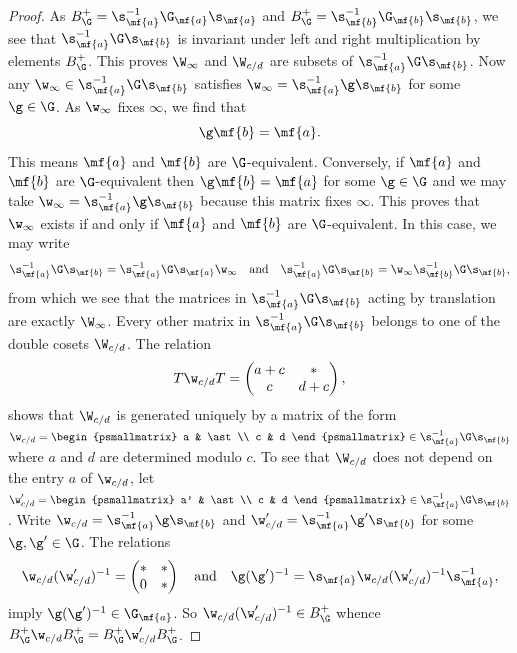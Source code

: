 \documentclass[12pt]{article}
\begin{document}
      \begin{proof}
        As \(B_{\G}^{+} = \s_{\mf{a}}^{-1}\G_{\mf{a}}\s_{\mf{a}}\) and \(B_{\G}^{+} = \s_{\mf{b}}^{-1}\G_{\mf{b}}\s_{\mf{b}}\), we see that \(\s_{\mf{a}}^{-1}\G\s_{\mf{b}}\) is invariant under left and right multiplication by elements \(B_{\G}^{+}\). This proves \(\W_{\infty}\) and \(\W_{c/d}\) are subsets of \(\s_{\mf{a}}^{-1}\G\s_{\mf{b}}\). Now any \(\w_{\infty} \in \s_{\mf{a}}^{-1}\G\s_{\mf{b}}\) satisfies \(\w_{\infty} = \s_{\mf{a}}^{-1}\g\s_{\mf{b}}\) for some \(\g \in \G\). As \(\w_{\infty}\) fixes \(\infty\), we find that
        \[
          \g\mf{b} = \mf{a}.
        \]
        This means \(\mf{a}\) and \(\mf{b}\) are \(\G\)-equivalent. Conversely, if \(\mf{a}\) and \(\mf{b}\) are \(\G\)-equivalent then \(\g\mf{b} = \mf{a}\) for some \(\g \in \G\) and we may take \(\w_{\infty} = \s_{\mf{a}}^{-1}\g\s_{\mf{b}}\) because this matrix fixes \(\infty\). This proves that \(\w_{\infty}\) exists if and only if \(\mf{a}\) and \(\mf{b}\) are \(\G\)-equivalent. In this case, we may write
        \[
          \s_{\mf{a}}^{-1}\G\s_{\mf{b}} = \s_{\mf{a}}^{-1}\G\s_{\mf{a}}\w_{\infty} \quad \text{and} \quad \s_{\mf{a}}^{-1}\G\s_{\mf{b}} = \w_{\infty}\s_{\mf{b}}^{-1}\G\s_{\mf{b}},
        \]
        from which we see that the matrices in \(\s_{\mf{a}}^{-1}\G\s_{\mf{b}}\) acting by translation are exactly \(\W_{\infty}\). Every other matrix in \(\s_{\mf{a}}^{-1}\G\s_{\mf{b}}\) belongs to one of the double cosets \(\W_{c/d}\). The relation
        \[
          T\w_{c/d}T = \begin{pmatrix} a+c & \ast \\ c & d+c \end{pmatrix},
        \]
        shows that \(\W_{c/d}\) is generated uniquely by a matrix of the form \(\w_{c/d} = \begin{psmallmatrix} a & \ast \\ c & d \end{psmallmatrix} \in \s_{\mf{a}}^{-1}\G\s_{\mf{b}}\) where \(a\) and \(d\) are determined modulo \(c\). To see that \(\W_{c/d}\) does not depend on the entry \(a\) of \(\w_{c/d}\), let \(\w'_{c/d} = \begin{psmallmatrix} a' & \ast \\ c & d \end{psmallmatrix} \in \s_{\mf{a}}^{-1}\G\s_{\mf{b}}\). Write \(\w_{c/d} = \s_{\mf{a}}^{-1}\g\s_{\mf{b}}\) and \(\w'_{c/d} = \s_{\mf{a}}^{-1}\g'\s_{\mf{b}}\) for some \(\g,\g' \in \G\). The relations
        \[
          \w_{c/d}(\w'_{c/d})^{-1} = \begin{pmatrix} \ast & \ast \\ 0 & \ast \end{pmatrix} \quad \text{and} \quad \g(\g')^{-1} = \s_{\mf{a}}\w_{c/d}(\w'_{c/d})^{-1}\s_{\mf{a}}^{-1},
        \]
        imply \(\g(\g')^{-1} \in \G_{\mf{a}}\). So \(\w_{c/d}(\w'_{c/d})^{-1} \in B_{\G}^{+}\) whence \(B_{\G}^{+}\w_{c/d}B_{\G}^{+} = B_{\G}^{+}\w'_{c/d}B_{\G}^{+}\).
      \end{proof}
\end{document}
